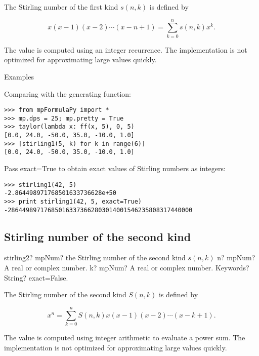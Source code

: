 The Stirling number of the first kind $s(n,k)$ is defined by

\begin{equation}
x(x-1)(x-2)\cdots(x-n+1) = \sum_{k=0}^n s(n,k) x^k.
\end{equation}

The value is computed using an integer recurrence. The implementation is not optimized for approximating large values quickly.

Examples

Comparing with the generating function:

\begin{lstlisting}
>>> from mpFormulaPy import *
>>> mp.dps = 25; mp.pretty = True
>>> taylor(lambda x: ff(x, 5), 0, 5)
[0.0, 24.0, -50.0, 35.0, -10.0, 1.0]
>>> [stirling1(5, k) for k in range(6)]
[0.0, 24.0, -50.0, 35.0, -10.0, 1.0]
\end{lstlisting}

Pass exact=True to obtain exact values of Stirling numbers as integers:

\begin{lstlisting}
>>> stirling1(42, 5)
-2.864498971768501633736628e+50
>>> print stirling1(42, 5, exact=True)
-286449897176850163373662803014001546235808317440000
\end{lstlisting}



\subsection{Stirling number of the second kind}

\begin{mpFunctionsExtract}
	\mpFunctionThree
	{stirling2? mpNum? the Stirling number of the second kind $s(n,k)$}
	{n? mpNum? A real or complex number.}
	{k? mpNum? A real or complex number.}	
	{Keywords? String? exact=False.}	
\end{mpFunctionsExtract}


The Stirling number of the second kind $S(n,k)$ is defined by

\begin{equation}
x^n = \sum_{k=0}^n S(n,k) x(x-1)(x-2)\cdots(x-k+1).
\end{equation}

The value is computed using integer arithmetic to evaluate a power sum. The implementation is not optimized for approximating large values quickly.

